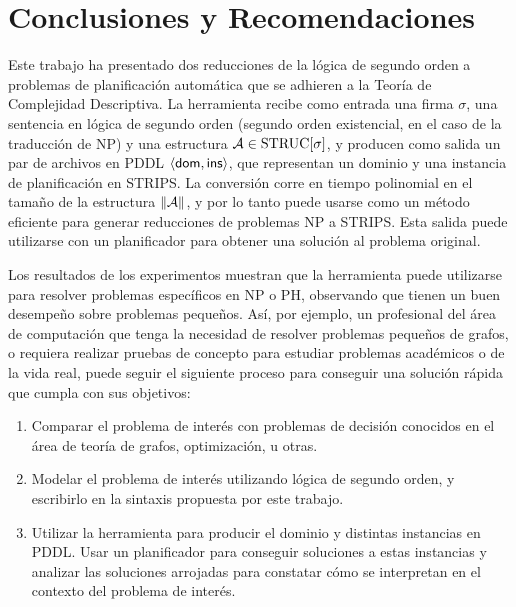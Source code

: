 \chapter{Conclusiones y Recomendaciones}
\label{Capitulo5}

Este trabajo ha presentado dos reducciones de la lógica de segundo orden a
problemas de planificación automática que se adhieren a la Teoría de
Complejidad Descriptiva. La herramienta recibe como entrada una firma
$\sigma$, una sentencia en lógica de segundo orden (segundo orden existencial,
en el caso de la traducción de NP) y una estructura $\mathcal{A}\in\text{STRUC}[\sigma]$, y
producen como salida un par de archivos en PDDL $\langle \mathsf{dom},\mathsf{ins} \rangle$, que
representan un dominio y una instancia de planificación en STRIPS. La
conversión corre en tiempo polinomial en el tamaño de la estructura $\|\mathcal{A}\|$, y
por lo tanto puede usarse como un método eficiente para generar reducciones de
problemas NP a STRIPS. Esta salida puede utilizarse con un planificador 
para obtener una solución al problema original.

Los resultados de los experimentos muestran que la herramienta puede utilizarse
para resolver problemas específicos en NP o PH, observando que tienen un buen desempeño
sobre problemas pequeños. Así, por ejemplo, un profesional del área de
computación que tenga la necesidad de resolver problemas pequeños de grafos, o
requiera realizar pruebas de concepto para estudiar problemas académicos o de la vida
real, puede seguir el siguiente proceso para conseguir una solución rápida que
cumpla con sus objetivos:
\begin{enumerate}
\item Comparar el problema de interés con problemas de decisión conocidos en el
área de teoría de grafos, optimización, u otras.
\item Modelar el problema de interés utilizando lógica de segundo orden, y
escribirlo en la sintaxis propuesta por este trabajo.
\item Utilizar la herramienta para producir el dominio y distintas instancias
en PDDL. Usar un planificador para conseguir soluciones a estas instancias y
analizar las soluciones arrojadas para constatar cómo se interpretan en el contexto del
problema de interés.
\end{enumerate}

